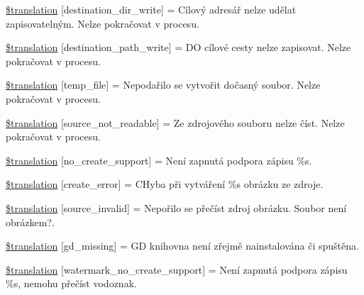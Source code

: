 \begin{DoxyCompactItemize}
\item 
\hyperlink{class_8upload_8cs___c_s_8php_a97608ea194a616db49141a0e6dee900c}{\$translation} \mbox{[}\textquotesingle{}destination\+\_\+dir\+\_\+write\textquotesingle{}\mbox{]} = \textquotesingle{}Cílový adresář nelze udělat zapisovatelným. Nelze pokračovat v procesu.\textquotesingle{}
\item 
\hyperlink{class_8upload_8cs___c_s_8php_a40e4e1962226b89fd76da5819a9602b0}{\$translation} \mbox{[}\textquotesingle{}destination\+\_\+path\+\_\+write\textquotesingle{}\mbox{]} = \textquotesingle{}D\+O cílové cesty nelze zapisovat. Nelze pokračovat v procesu.\textquotesingle{}
\item 
\hyperlink{class_8upload_8cs___c_s_8php_a2baece8da11e20d45175db91851ec3e3}{\$translation} \mbox{[}\textquotesingle{}temp\+\_\+file\textquotesingle{}\mbox{]} = \textquotesingle{}Nepodařilo se vytvořit dočasný soubor. Nelze pokračovat v procesu.\textquotesingle{}
\item 
\hyperlink{class_8upload_8cs___c_s_8php_a922967ca2df0efdd455261142d8e5715}{\$translation} \mbox{[}\textquotesingle{}source\+\_\+not\+\_\+readable\textquotesingle{}\mbox{]} = \textquotesingle{}Ze zdrojového souboru nelze číst. Nelze pokračovat v procesu.\textquotesingle{}
\item 
\hyperlink{class_8upload_8cs___c_s_8php_a346dfd1ade29f583dd20d345c436859f}{\$translation} \mbox{[}\textquotesingle{}no\+\_\+create\+\_\+support\textquotesingle{}\mbox{]} = \textquotesingle{}Není zapnutá podpora zápisu \%s.\textquotesingle{}
\item 
\hyperlink{class_8upload_8cs___c_s_8php_a53013ce9255c4e1849098ddd9fdb2b3f}{\$translation} \mbox{[}\textquotesingle{}create\+\_\+error\textquotesingle{}\mbox{]} = \textquotesingle{}C\+Hyba při vytváření \%s obrázku ze zdroje.\textquotesingle{}
\item 
\hyperlink{class_8upload_8cs___c_s_8php_a6ab0a660b457eaf2d3434b225449fdd6}{\$translation} \mbox{[}\textquotesingle{}source\+\_\+invalid\textquotesingle{}\mbox{]} = \textquotesingle{}Nepořilo se přečíst zdroj obrázku. Soubor není obrázkem?.\textquotesingle{}
\item 
\hyperlink{class_8upload_8cs___c_s_8php_a7f3dfcc0db4bbc0f2e7210c439798e56}{\$translation} \mbox{[}\textquotesingle{}gd\+\_\+missing\textquotesingle{}\mbox{]} = \textquotesingle{}G\+D knihovna není zřejmě nainstalována či spuštěna.\textquotesingle{}
\item 
\hyperlink{class_8upload_8cs___c_s_8php_a82d5853430ab72dc1f9799ec36144cc6}{\$translation} \mbox{[}\textquotesingle{}watermark\+\_\+no\+\_\+create\+\_\+support\textquotesingle{}\mbox{]} = \textquotesingle{}Není zapnutá podpora zápisu \%s, nemohu přečíst vodoznak.\textquotesingle{}

\end{DoxyCompactItemize}

